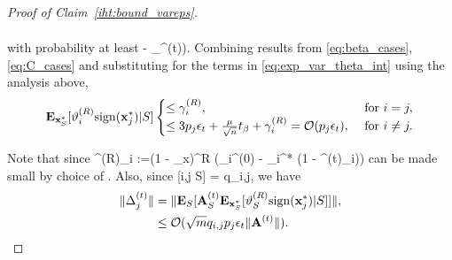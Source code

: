 \documentclass{article}
\newcommand{\sgn}{{\rm sign}}
\def\[#1\]{{$#1$}}
\def\b#1{{\mathbf{#1}}}
\begin{document}
\begin{proof}[Proof of Claim~\ref{iht:bound_vareps}]
\begin{align*}
	\end{align*}
	
	with probability at least \[(1 - \delta_{\beta}^{(t)})\].
	Combining results from \eqref{eq:beta_cases}, \eqref{eq:C_cases} and substituting for the terms in \eqref{eq:exp_var_theta_int} using the analysis above,
	\begin{align*}
	\b{E}_{\b{x}_S^*}[\vartheta^{(R)}_{i}\sgn(\b{x}^*_{j})|S] 
	\begin{cases}
	\leq  \gamma^{(R)}_i, & ~\text{for}~ i = j, \\

 	\leq 3p_{j}\epsilon_t + \tfrac{\mu}{\sqrt{n}}t_\beta + \gamma^{(R)}_i = \mathcal{O}(p_j\epsilon_t), & ~\text{for}~ i \neq j.
	\end{cases}
	\end{align*}
	
	Note that since \[ \gamma^{(R)}_{i} :=(1 - \eta_{x})^{R} (\b{x}_{i}^{(0)}  - \b{x}_{i}^* (1 - \lambda^{(t)}_{i}))\] can be made small by choice of \[R\]. Also, since \[\b{Pr}[i,j \in S] = q_{i,j}\], we have
	\begin{align*}
	\|\Delta^{(t)}_{j}\|&= \|\b{E}_S[\b{A}^{(t)}_S\b{E}_{\b{x}_S^*}[\vartheta^{(R)}_S\sgn(\b{x}^*_{j})|S]]\|,\\
	&\leq  \mathcal{O}(\sqrt{m}q_{i,j}p_{j}\epsilon_t\|\b{A}^{(t)}\|).
	\end{align*}
	
	
	
	
	
	
	
	
	
	
	
	
	
	
	
	
	
	
	
	
	
	
	
	
	
	
	
	
	
	
	
	
	
	
	
	
	
	
	
	
	
	
	
	
	
	
	
	
	
	
	
	
	

\end{proof}
\end{document}
